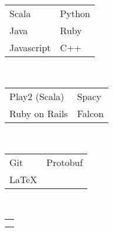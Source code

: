 {		
		\majorsection{\awards} 
		\awardAmplify 
		\awardGoldenTicket 
		\awardEbayApi 
		
		\majorsection{\projects} 
		\projectParasite 
		\projectPytext 
		
		\majorsection{\educationhistory} 
		\educationUW 
		\educationEvergreen 
		\educationHyogo
	}{ %
		
		\noindent\begin{minipage}[t]{0.275\textwidth}
			
			\sidesection{\educationhistory} \quarterlinebreak\\
			\educationUW 
			\educationEvergreen
			\educationHyogo
			
			\sidesection{\coursework} \\
			\sidebarcoursework
			
			
			\sidesection{\skills} \\ 
			\textbf{\skillsprogramminglanguages} \\
			\begin{tabular}{l l}
				Scala &  Python  \\ 
				Java  & Ruby  \\ 
				Javascript & C++
			\end{tabular}
			
			\textbf{\skillsframeworks} \\
			\begin{tabular}{l l}
				Play2 (Scala) & Spacy  \\
				Ruby on Rails & Falcon 
			\end{tabular}
			
			\textbf{\skillsmisc} \\
			\begin{tabular}{l l}
				Git & Protobuf \\
				\LaTeX
			\end{tabular}
			
			\textbf{\skillslanguage} \\
			\begin{tabular}{l}
				\skillenglish \\
				\skilljapanese
			\end{tabular} \quarterlinebreak \\
			
			
		\end{minipage}
		\hfill
		\begin{minipage}[t]{0.7\textwidth}
			\majorsection{\experience} 
				\jobexpNPD
				\jobexpGSP
				\jobexpGDIIntern
		\majorsection{\awards} 
		\awardAmplify 
		\awardGoldenTicket 
		
		\majorsection{\projects} 
		\projectParasite 
		\projectPytext 
		\end{minipage}
		
	}
	

